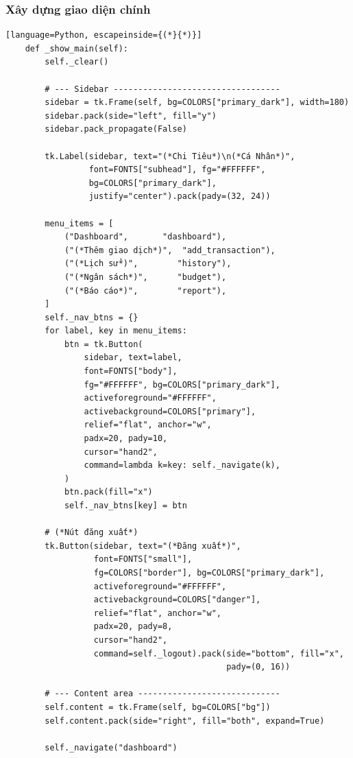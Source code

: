\documentclass[12pt,letterpaper]{article}
\begin{document}
\subsubsection{Xây dựng giao diện chính}
\begin{lstlisting}[language=Python, escapeinside={(*}{*)}]
    def _show_main(self):
        self._clear()

        # --- Sidebar ----------------------------------
        sidebar = tk.Frame(self, bg=COLORS["primary_dark"], width=180)
        sidebar.pack(side="left", fill="y")
        sidebar.pack_propagate(False)

        tk.Label(sidebar, text="(*Chi Tiêu*)\n(*Cá Nhân*)",
                 font=FONTS["subhead"], fg="#FFFFFF",
                 bg=COLORS["primary_dark"],
                 justify="center").pack(pady=(32, 24))

        menu_items = [
            ("Dashboard",       "dashboard"),
            ("(*Thêm giao dịch*)",  "add_transaction"),
            ("(*Lịch sử*)",        "history"),
            ("(*Ngân sách*)",      "budget"),
            ("(*Báo cáo*)",        "report"),
        ]
        self._nav_btns = {}
        for label, key in menu_items:
            btn = tk.Button(
                sidebar, text=label,
                font=FONTS["body"],
                fg="#FFFFFF", bg=COLORS["primary_dark"],
                activeforeground="#FFFFFF",
                activebackground=COLORS["primary"],
                relief="flat", anchor="w",
                padx=20, pady=10,
                cursor="hand2",
                command=lambda k=key: self._navigate(k),
            )
            btn.pack(fill="x")
            self._nav_btns[key] = btn

        # (*Nút đăng xuất*)
        tk.Button(sidebar, text="(*Đăng xuất*)",
                  font=FONTS["small"],
                  fg=COLORS["border"], bg=COLORS["primary_dark"],
                  activeforeground="#FFFFFF",
                  activebackground=COLORS["danger"],
                  relief="flat", anchor="w",
                  padx=20, pady=8,
                  cursor="hand2",
                  command=self._logout).pack(side="bottom", fill="x",
                                             pady=(0, 16))

        # --- Content area -----------------------------
        self.content = tk.Frame(self, bg=COLORS["bg"])
        self.content.pack(side="right", fill="both", expand=True)

        self._navigate("dashboard")
\end{lstlisting}
\end{document}
